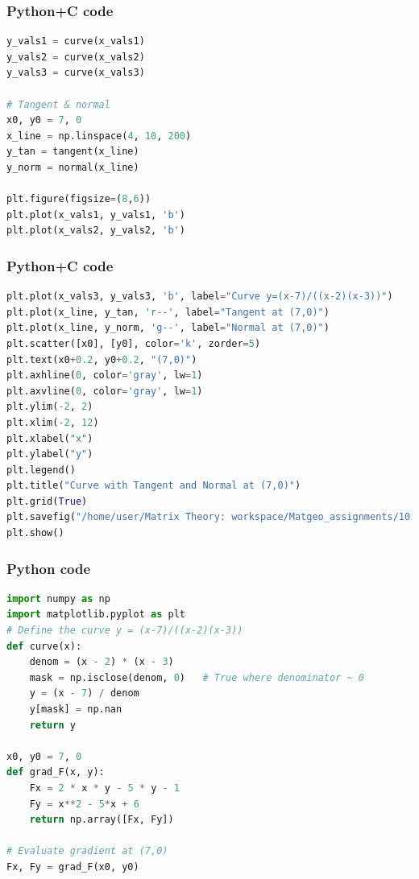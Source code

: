 \documentclass{beamer}
\begin{document}
\begin{frame}[fragile]
    \frametitle{Python+C code}

    \begin{lstlisting}[language=Python]
y_vals1 = curve(x_vals1)
y_vals2 = curve(x_vals2)
y_vals3 = curve(x_vals3)

# Tangent & normal
x0, y0 = 7, 0
x_line = np.linspace(4, 10, 200)
y_tan = tangent(x_line)
y_norm = normal(x_line)

plt.figure(figsize=(8,6))
plt.plot(x_vals1, y_vals1, 'b')
plt.plot(x_vals2, y_vals2, 'b')
    \end{lstlisting}
\end{frame}

\begin{frame}[fragile]
    \frametitle{Python+C code}

    \begin{lstlisting}[language=Python]
plt.plot(x_vals3, y_vals3, 'b', label="Curve y=(x-7)/((x-2)(x-3))")
plt.plot(x_line, y_tan, 'r--', label="Tangent at (7,0)")
plt.plot(x_line, y_norm, 'g--', label="Normal at (7,0)")
plt.scatter([x0], [y0], color='k', zorder=5)
plt.text(x0+0.2, y0+0.2, "(7,0)")
plt.axhline(0, color='gray', lw=1)
plt.axvline(0, color='gray', lw=1)
plt.ylim(-2, 2)
plt.xlim(-2, 12)
plt.xlabel("x")
plt.ylabel("y")
plt.legend()
plt.title("Curve with Tangent and Normal at (7,0)")
plt.grid(True)
plt.savefig("/home/user/Matrix Theory: workspace/Matgeo_assignments/10.4.2/figs/figure_1.png")
plt.show()

    \end{lstlisting}
\end{frame}

\begin{frame}[fragile]
    \frametitle{Python code}
    \begin{lstlisting}[language=Python]
import numpy as np
import matplotlib.pyplot as plt
# Define the curve y = (x-7)/((x-2)(x-3))
def curve(x):
    denom = (x - 2) * (x - 3)
    mask = np.isclose(denom, 0)   # True where denominator ~ 0
    y = (x - 7) / denom
    y[mask] = np.nan
    return y

x0, y0 = 7, 0
def grad_F(x, y):
    Fx = 2 * x * y - 5 * y - 1
    Fy = x**2 - 5*x + 6
    return np.array([Fx, Fy])

# Evaluate gradient at (7,0)
Fx, Fy = grad_F(x0, y0)
    \end{lstlisting}   
\end{frame}
\end{document}

